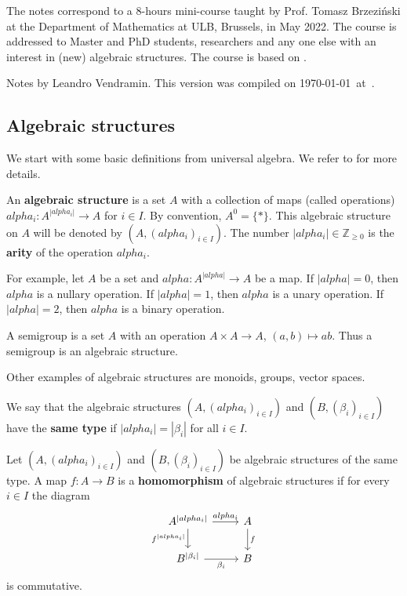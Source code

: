 \documentclass{svmult}
\def\alpha{alpha}%
\newcommand{\Z}{\mathbb{Z}}
\begin{document}
The notes correspond to a 8-hours mini-course 
taught by Prof. Tomasz Brzezi\'nski at the 
Department of Mathematics at ULB, Brussels, in May 2022.
The course is addressed to Master and PhD students,
researchers and any one else with an 
interest in (new) algebraic structures. The course
is based on \cite{MR4009388,MR4368576,MR4400063}. 


Notes by Leandro Vendramin.  
This version
was compiled on \today~at~\currenttime.

\subsection{Algebraic structures}

We start with some basic definitions from universal algebra. We refer
to \cite{MR620952} for more details. 

\begin{definition}
    An \textbf{algebraic structure} is a set $A$ 
    with a collection of maps (called operations) 
    $\alpha_i\colon A^{|\alpha_i|}\to A$ for $i\in I$. By 
    convention, $A^0=\{*\}$. This algebraic structure on $A$ 
    will be denoted by $(A,(\alpha_i)_{i\in I})$. 
    The number $|\alpha_i|\in\Z_{\geq0}$ is the
    \textbf{arity} of the operation $\alpha_i$. 
\end{definition}

For example, let $A$ be a set and 
$\alpha\colon A^{|\alpha|}\to A$ be a map. If $|\alpha|=0$, 
then $\alpha$ is a nullary operation. If $|\alpha|=1$, then 
$\alpha$ is a unary operation. If $|\alpha|=2$, then $\alpha$ is a binary operation. 

\begin{example}
    A semigroup is a set $A$ with an  
    operation $A\times A\to A$, $(a,b)\mapsto ab$. Thus 
    a semigroup 
    is an algebraic structure.
\end{example}

Other examples of algebraic structures are 
monoids, groups, vector spaces. 

\begin{definition}
    We say that the algebraic structures $(A,(\alpha_i)_{i\in I})$ and $(B,(\beta_i)_{i\in I})$ 
    have the \textbf{same type} if $|\alpha_i|=|\beta_i|$ for all $i\in I$.
\end{definition}

\begin{definition}
    Let $(A,(\alpha_i)_{i\in I})$ and $(B,(\beta_i)_{i\in I})$ be 
    algebraic structures of the same type. A map $f\colon A\to B$ 
    is a \textbf{homomorphism} of algebraic structures if 
    for every $i\in I$ the diagram 
    \[
    \begin{tikzcd}
	{A^{|\alpha_i|}} & A \\
	{B^{|\beta_i|}} & B
	\arrow["{\alpha_i}", from=1-1, to=1-2]
	\arrow["f", from=1-2, to=2-2]
	\arrow["{f^{|\alpha_i|}}"', from=1-1, to=2-1]
	\arrow["{\beta_i}"', from=2-1, to=2-2]
    \end{tikzcd}
    \]
    is commutative.     
\end{definition}
\end{document}
